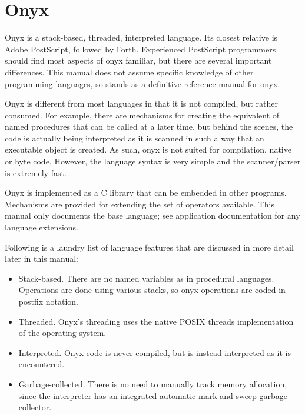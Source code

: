 %
%
%
%
%

\clearemptydoublepage
\chapter{Onyx}
\label{onyxlang}

Onyx is a stack-based, threaded, interpreted language.  Its closest relative is
Adobe PostScript, followed by Forth.  Experienced PostScript programmers should
find most aspects of onyx familiar, but there are several important differences.
This manual does not assume specific knowledge of other programming languages,
so stands as a definitive reference manual for onyx.

Onyx is different from most languages in that it is not compiled, but rather
consumed.  For example, there are mechanisms for creating the equivalent of
named procedures that can be called at a later time, but behind the scenes, the
code is actually being interpreted as it is scanned in such a way that an
executable object is created.  As such, onyx is not suited for compilation,
native or byte code.  However, the language syntax is very simple and the
scanner/parser is extremely fast.

Onyx is implemented as a C library that can be embedded in other programs.
Mechanisms are provided for extending the set of operators available.  This
manual only documents the base language; see application documentation for any
language extensions.

Following is a laundry list of language features that are discussed in more
detail later in this manual:

\begin{itemize}
\item{Stack-based.  There are no named variables as in procedural languages.
Operations are done using various stacks, so onyx operations are coded in
postfix notation.}
\item{Threaded.  Onyx's threading uses the native POSIX threads implementation
of the operating system.}
\item{Interpreted.  Onyx code is never compiled, but is instead interpreted as
it is encountered.}
\item{Garbage-collected.  There is no need to manually track memory allocation,
since the interpreter has an integrated automatic mark and sweep garbage
collector.}
\end{itemize}

